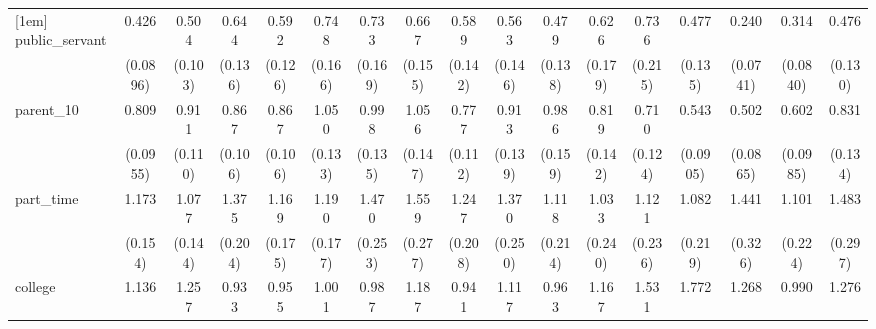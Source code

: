 {\begin{tabular}{l*{16}{c}}
[1em]
public\_servant      &       0.426\sym{***}&       0.504\sym{***}&       0.644\sym{*}  &       0.592\sym{*}  &       0.748         &       0.733         &       0.667         &       0.589\sym{*}  &       0.563\sym{*}  &       0.479\sym{*}  &       0.626         &       0.736         &       0.477\sym{**} &       0.240\sym{***}&       0.314\sym{***}&       0.476\sym{**} \\
                    &    (0.0896)         &     (0.103)         &     (0.136)         &     (0.126)         &     (0.166)         &     (0.169)         &     (0.155)         &     (0.142)         &     (0.146)         &     (0.138)         &     (0.179)         &     (0.215)         &     (0.135)         &    (0.0741)         &    (0.0840)         &     (0.130)         \\
[1em]
parent\_10           &       0.809         &       0.911         &       0.867         &       0.867         &       1.050         &       0.998         &       1.056         &       0.777         &       0.913         &       0.986         &       0.819         &       0.710\sym{*}  &       0.543\sym{***}&       0.502\sym{***}&       0.602\sym{**} &       0.831         \\
                    &    (0.0955)         &     (0.110)         &     (0.106)         &     (0.106)         &     (0.133)         &     (0.135)         &     (0.147)         &     (0.112)         &     (0.139)         &     (0.159)         &     (0.142)         &     (0.124)         &    (0.0905)         &    (0.0865)         &    (0.0985)         &     (0.134)         \\
[1em]
part\_time           &       1.173         &       1.077         &       1.375\sym{*}  &       1.169         &       1.190         &       1.470\sym{*}  &       1.559\sym{*}  &       1.247         &       1.370         &       1.118         &       1.033         &       1.121         &       1.082         &       1.441         &       1.101         &       1.483\sym{*}  \\
                    &     (0.154)         &     (0.144)         &     (0.204)         &     (0.175)         &     (0.177)         &     (0.253)         &     (0.277)         &     (0.208)         &     (0.250)         &     (0.214)         &     (0.240)         &     (0.236)         &     (0.219)         &     (0.326)         &     (0.224)         &     (0.297)         \\
[1em]
college             &       1.136         &       1.257         &       0.933         &       0.955         &       1.001         &       0.987         &       1.187         &       0.941         &       1.117         &       0.963         &       1.167         &       1.531\sym{*}  &       1.772\sym{**} &       1.268         &       0.990         &       1.276         \\

\end{tabular}}
